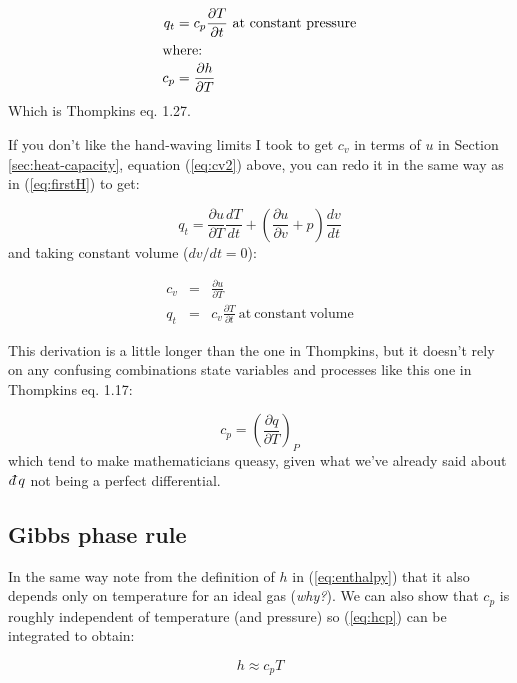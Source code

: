 \documentclass[12pt]{article}
\newcommand{\dbar}{d\mkern-6mu\mathchar'26}
\begin{document}
\begin{align}
  \label{eq:hcp}
  q_t &= c_p \frac{\partial T}{\partial t}\ \mathrm{at\ constant\ pressure}\\
\intertext{where:} 
  c_p &= \frac{\partial{h}}{\partial T}
\end{align}
Which is Thompkins eq. 1.27.

If you don't like the hand-waving limits I took to get $c_v$ in terms of $u$
in Section \ref{sec:heat-capacity}, equation (\ref{eq:cv2}) above, you can redo it in the
same way as in (\ref{eq:firstH})  to get:

  \begin{equation}
    \label{eq:firstU}
  q_t = \frac{\partial u}{\partial T} \frac{dT}{dt} + \left ( \frac{\partial u}{\partial v} + p 
                        \right ) \frac{dv}{dt}
  \end{equation}
and taking constant volume ($dv/dt=0$):

\begin{eqnarray}
  \label{eq:ucv}
  c_v &=& \frac{\partial{u}}{\partial T}\\
  q_t &=& c_v \frac{\partial T}{\partial t}\ \mathrm{at\ constant\ volume}
\end{eqnarray}

This derivation is a little longer than the one in Thompkins, but it doesn't rely on any
confusing combinations state variables and processes like this one in Thompkins eq. 1.17:

\begin{equation}
  \label{eq:bizarre}
c_p =  \left ( \frac{ \partial q}{ \partial T} \right )_P
\end{equation}
which tend to make mathematicians queasy, given what we've already said about $\dbar q$ not being a perfect differential.

\subsection{Gibbs phase rule}
\label{sec:gibbs-phase-rule}

In the same way note from the definition of $h$ in (\ref{eq:enthalpy}) that it
also depends only on temperature for an ideal gas (\textit{why?}).
We can also show that $c_p$ is roughly independent of temperature (and
pressure) so (\ref{eq:hcp}) can be integrated to obtain:

\begin{equation}
  h \approx c_p T
\end{equation}
\end{document}
